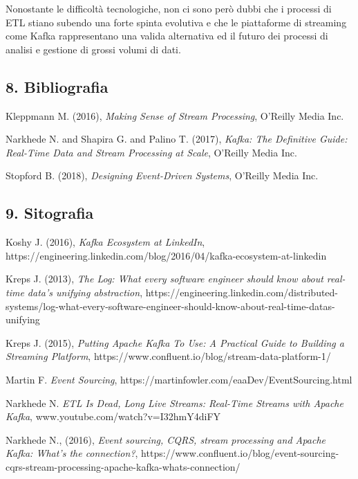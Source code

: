 \documentclass[]{article}
\begin{document}
Nonostante le difficoltà tecnologiche, non ci sono però dubbi che i
processi di ETL stiano subendo una forte spinta evolutiva e che le
piattaforme di streaming come Kafka rappresentano una valida alternativa
ed il futuro dei processi di analisi e gestione di grossi volumi di
dati.

\newpage

\hypertarget{bibliografia}{\subsection{8.
Bibliografia}\label{bibliografia}}

Kleppmann M. (2016), \emph{Making Sense of Stream Processing}, O'Reilly
Media Inc.

Narkhede N. and Shapira G. and Palino T. (2017), \emph{Kafka: The
Definitive Guide: Real-Time Data and Stream Processing at Scale},
O'Reilly Media Inc.

Stopford B. (2018), \emph{Designing Event-Driven Systems}, O'Reilly
Media Inc.

\hypertarget{sitografia}{\subsection{9. Sitografia}\label{sitografia}}

\small
Koshy J. (2016), \emph{Kafka Ecosystem at LinkedIn},\\
https://engineering.linkedin.com/blog/2016/04/kafka-ecosystem-at-linkedin

Kreps J. (2013), \emph{The Log: What every software engineer should know
about real-time data's unifying abstraction},
https://engineering.linkedin.com/distributed-systems/log-what-every-software-engineer-should-know-about-real-time-datas-unifying

Kreps J. (2015), \emph{Putting Apache Kafka To Use: A Practical Guide to
Building a Streaming Platform},
https://www.confluent.io/blog/stream-data-platform-1/

Martin F. \emph{Event Sourcing},
https://martinfowler.com/eaaDev/EventSourcing.html

Narkhede N. \emph{ETL Is Dead, Long Live Streams: Real-Time Streams with
Apache Kafka}, www.youtube.com/watch?v=I32hmY4diFY

Narkhede N., (2016), \emph{Event sourcing, CQRS, stream processing and
Apache Kafka: What's the connection?},
https://www.confluent.io/blog/event-sourcing-cqrs-stream-processing-apache-kafka-whats-connection/
\end{document}

